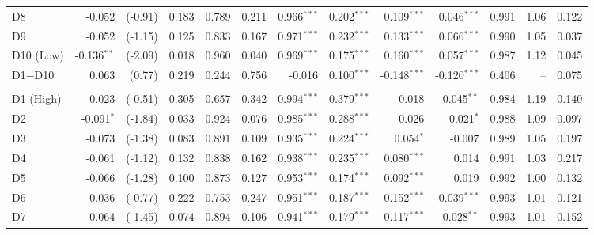 \begin{table}[!htbp]
{\begin{tabular*}{\linewidth}{@{\extracolsep{\fill}}lrrrrrrrrrrrr}
\hspace{1em}D8 & -0.052 & (-0.91) & 0.183 & 0.789 & 0.211 & 0.966$^{***}$ & 0.202$^{***}$ & 0.109$^{***}$ & 0.046$^{***}$ & 0.991 & 1.06 & 0.122\\
\hspace{1em}D9 & -0.052 & (-1.15) & 0.125 & 0.833 & 0.167 & 0.971$^{***}$ & 0.232$^{***}$ & 0.133$^{***}$ & 0.066$^{***}$ & 0.990 & 1.05 & 0.037\\
\hspace{1em}D10 (Low) & -0.136$^{**}$ & (-2.09) & 0.018 & 0.960 & 0.040 & 0.969$^{***}$ & 0.175$^{***}$ & 0.160$^{***}$ & 0.057$^{***}$ & 0.987 & 1.12 & 0.045\\
\hspace{1em}D1$-$D10 & 0.063 & (0.77) & 0.219 & 0.244 & 0.756 & -0.016 & 0.100$^{***}$ & -0.148$^{***}$ & -0.120$^{***}$ & 0.406 & -- & 0.075\\
\addlinespace[0.3em]
\hline
\multicolumn{13}{l}{\textit{Panel B: Full sample, raw-alpha ranking (robustness)}}\\
\hspace{1em}D1 (High) & -0.023 & (-0.51) & 0.305 & 0.657 & 0.342 & 0.994$^{***}$ & 0.379$^{***}$ & -0.018 & -0.045$^{**}$ & 0.984 & 1.19 & 0.140\\
\hspace{1em}D2 & -0.091$^{*}$ & (-1.84) & 0.033 & 0.924 & 0.076 & 0.985$^{***}$ & 0.288$^{***}$ & 0.026 & 0.021$^{*}$ & 0.988 & 1.09 & 0.097\\
\hspace{1em}D3 & -0.073 & (-1.38) & 0.083 & 0.891 & 0.109 & 0.935$^{***}$ & 0.224$^{***}$ & 0.054$^{*}$ & -0.007 & 0.989 & 1.05 & 0.197\\
\hspace{1em}D4 & -0.061 & (-1.12) & 0.132 & 0.838 & 0.162 & 0.938$^{***}$ & 0.235$^{***}$ & 0.080$^{***}$ & 0.014 & 0.991 & 1.03 & 0.217\\
\hspace{1em}D5 & -0.066 & (-1.28) & 0.100 & 0.873 & 0.127 & 0.953$^{***}$ & 0.174$^{***}$ & 0.092$^{***}$ & 0.019 & 0.992 & 1.00 & 0.132\\
\hspace{1em}D6 & -0.036 & (-0.77) & 0.222 & 0.753 & 0.247 & 0.951$^{***}$ & 0.187$^{***}$ & 0.152$^{***}$ & 0.039$^{***}$ & 0.993 & 1.01 & 0.121\\
\hspace{1em}D7 & -0.064 & (-1.45) & 0.074 & 0.894 & 0.106 & 0.941$^{***}$ & 0.179$^{***}$ & 0.117$^{***}$ & 0.028$^{**}$ & 0.993 & 1.01 & 0.152\\

\end{tabular*}}
\end{table}
